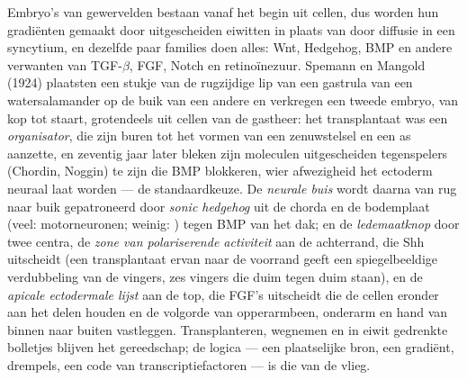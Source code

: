 \begin{definition}\label{def:b3:developmental-genetics:organiser}
Embryo's van gewervelden bestaan vanaf het begin uit cellen, dus worden
hun gradiënten gemaakt door uitgescheiden eiwitten in plaats van door
diffusie in een syncytium, en dezelfde paar families doen alles: Wnt,
Hedgehog, BMP en andere verwanten van TGF-$\beta$, FGF, Notch en
retinoïnezuur. Spemann en Mangold (1924) plaatsten een stukje van de
rugzijdige lip van een gastrula van een watersalamander op de buik van
een andere en verkregen een tweede embryo, van kop tot staart,
grotendeels uit cellen van de gastheer: het transplantaat was een
\emph{organisator}, die zijn buren tot het vormen van een zenuwstelsel
en een as aanzette, en zeventig jaar later bleken zijn moleculen
uitgescheiden tegenspelers (Chordin, Noggin) te zijn die BMP blokkeren,
wier afwezigheid het ectoderm neuraal laat worden --- de
standaardkeuze. De \emph{neurale buis} wordt daarna van rug naar buik
gepatroneerd door \emph{sonic hedgehog} uit de chorda en de bodemplaat
(veel: motorneuronen; weinig: ) tegen BMP van het dak; en
de \emph{ledemaatknop} door twee centra, de \emph{zone van
polariserende activiteit} aan de achterrand, die Shh uitscheidt (een
transplantaat ervan naar de voorrand geeft een spiegelbeeldige
verdubbeling van de vingers, zes vingers die duim tegen duim staan), en
de \emph{apicale ectodermale lijst} aan de top, die FGF's uitscheidt
die de cellen eronder aan het delen houden en de volgorde van
opperarmbeen, onderarm en hand van binnen naar buiten vastleggen.
Transplanteren, wegnemen en in eiwit gedrenkte bolletjes blijven het
gereedschap; de logica --- een plaatselijke bron, een gradiënt,
drempels, een code van transcriptiefactoren --- is die van de vlieg.
\end{definition}

